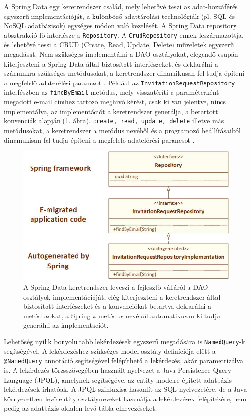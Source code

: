 \begin{reviewed}
A Spring Data egy keretrendszer család, mely lehetővé teszi az adat-hozzáférés egyszerű implementációját, a különböző adattárolási technológiák (pl. SQL és NoSQL adatbázisok) egységes módon való kezelését. 
A Spring Data repository absztrakció fő interfésze a \texttt{Repository}. A \texttt{CrudRepository} ennek leszármazottja, és lehetővé teszi a CRUD (Create, Read, Update, Delete) műveletek egyszerű megadását. Nem szükséges implementálni a DAO osztályokat, elegendő csupán kiterjeszteni a Spring Data által biztosított interfészeket, és deklarálni a  számunkra szükséges metódusokat, a keretrendszer dinamikusan fel tudja építeni a megfelelő adaterélési parancsot \cite{DataJPA}. Például az  \texttt{InvitationRequestRepository} interfészben az \texttt{findByEmail} metódus, mely visszatéríti a paraméterként megadott e-mail címhez tartozó meghívó kérést, csak ki van jelentve, nincs implementálva, az implementációt a keretrendszer generálja, a betartott konvenciók alapján (\ref{fig:SpringData}. ábra). \texttt{create, read, update, delete} illetve más metódusokat, a keretrendszer a metódus nevéből és a programozó beállításaiból dinamukisan fel tudja építeni a megfelelő adatelérési parancsot \cite{DataJPA}.  
\begin{figure}
  \centering
  \includegraphics[width=0.7\linewidth]{images/SpringData}
  \caption{A Spring Data keretrendszer leveszi a fejlesztő válláról a DAO osztályok implementációját, elég kiterjeszteni a keretrendszer által biztosított interfészeket és a konvenciókat betartva deklarálni a metódusokat, a Spring a metódus nevéből automatikusan ki tudja generálni az implementációt.}
  \label{fig:SpringData}
\end{figure}

Lehetőség nyílik bonyolultabb lekérdezések egyszerű megadására is \texttt{NamedQuery}-k segítségével. A lekérdezéshez szükséges model osztály definíciója előtt a \texttt{@NamedQuery} annotáció segítségével felépíthető a lekérdezés, akár parametrizálva is. A lekérdezés törzsszövegében használt nyelvezet a  Java Persistence Query Language (JPQL), amelynek segítségével az entity modelre épített adatbázis lekérdezések írhatóak. A JPQL szintaxisa hasonlít az SQL nyelvezetére, de a Java környezetben levő entity osztályneveket használja a lekérdezések felépítésére, nem pedig az adatbázis oldalon levő tábla elnevezéseket.


\end{reviewed}
